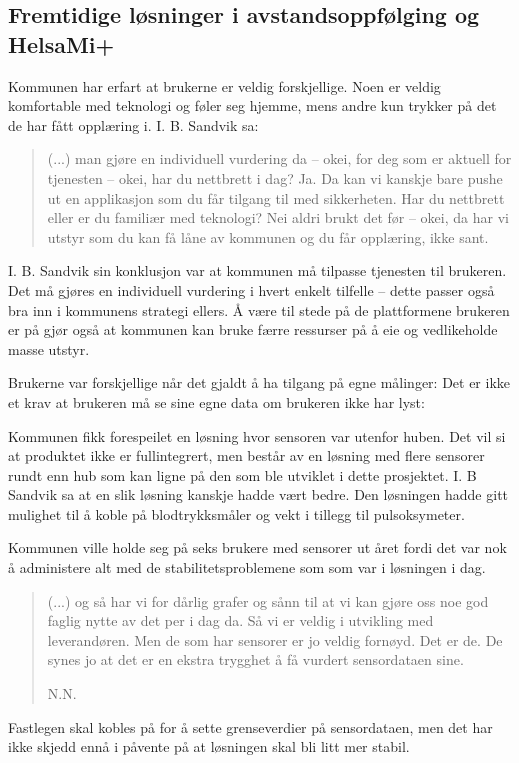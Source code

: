 \subsection{Fremtidige løsninger i avstandsoppfølging og HelsaMi+}
Kommunen har erfart at brukerne er veldig forskjellige. Noen er veldig komfortable med teknologi og føler seg hjemme, mens andre
kun trykker på det de har fått opplæring i. I. B. Sandvik sa:
\blockquote{
(...) man gjøre en individuell vurdering da -- okei, for deg som er aktuell for tjenesten -- okei, har du nettbrett i dag? Ja.
Da kan vi kanskje bare pushe ut en applikasjon som
du får tilgang til med sikkerheten. Har du nettbrett eller er du familiær med teknologi? Nei aldri brukt det før -- okei,
da har vi utstyr som du kan få låne av kommunen og du får opplæring, ikke sant.
}

I. B. Sandvik sin konklusjon var at kommunen må tilpasse tjenesten til brukeren. Det må gjøres en individuell vurdering i hvert enkelt tilfelle --
dette passer også bra inn i kommunens strategi ellers. Å være til stede på de plattformene brukeren er på gjør også at kommunen kan
bruke færre ressurser på å eie og vedlikeholde masse utstyr.

Brukerne var forskjellige når det gjaldt å ha tilgang på egne målinger: 
Det er ikke et krav at brukeren må se sine egne data om brukeren ikke har lyst: 

Kommunen fikk forespeilet en løsning hvor sensoren var utenfor huben. Det vil si at produktet ikke er fullintegrert, men består
av en løsning med flere sensorer rundt enn hub som kan ligne på den som ble utviklet i dette prosjektet. I. B Sandvik sa
at en slik løsning kanskje hadde vært bedre. Den løsningen hadde gitt mulighet til å koble på blodtrykksmåler og vekt i tillegg til
pulsoksymeter.

Kommunen ville holde seg på seks brukere med sensorer ut året fordi det var nok å administere alt med de stabilitetsproblemene som
som var i løsningen i dag.
\blockquote[N.N.]{(...) og så har vi for dårlig grafer og sånn til at vi kan gjøre oss noe god faglig nytte av det per i dag da. Så vi
    er veldig i utvikling med leverandøren. Men de som har sensorer er jo veldig fornøyd. Det er de.
De synes jo at det er en ekstra trygghet å få vurdert sensordataen sine.} Fastlegen skal kobles på for å sette grenseverdier på sensordataen,
men det har ikke skjedd ennå i påvente på at løsningen skal bli litt mer stabil.

